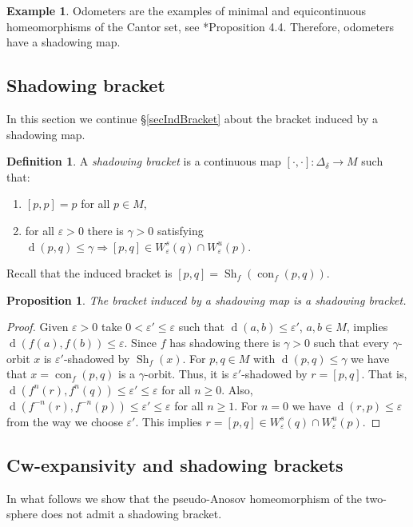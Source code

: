 \documentclass[12pt]{amsart}
\theoremstyle{plain}
\newtheorem{prop}[thm]{Proposition}
\theoremstyle{definition}
\newtheorem{ex}[thm]{Example}
\newtheorem{df}[thm]{Definition}
\theoremstyle{remark}
\DeclareMathOperator{\dist}{d}
\DeclareMathOperator{\con}{con}
\DeclareMathOperator{\shm}{Sh}
\renewcommand{\epsilon}{\varepsilon}
\begin{document}
\begin{ex}
	Odometers are the examples of minimal and equicontinuous homeomorphisms of the Cantor set, see \cite{Kurka}*{Proposition 4.4}.
	Therefore, odometers have a shadowing map.
\end{ex}

\subsection{Shadowing bracket}
\label{secShBra}
In this section we continue \S\ref{secIndBracket} about the bracket induced by a shadowing map.
\begin{df}
	A \textit{shadowing bracket} is a continuous map $[\cdot,\cdot]\colon \Delta_\delta\to M$
	such that:
	\begin{enumerate}
		\item $[p,p]=p$ for all $p\in M$,
		\item for all $\epsilon>0$ there is $\gamma>0$ satisfying
		$\dist(p,q)\leq\gamma \Rightarrow
		[p,q]\in W^s_\epsilon(q)\cap W^u_\epsilon(p).$
	\end{enumerate}
\end{df}
Recall that the induced bracket is
$[p,q]=\shm_f(\con_f(p,q)).$
\begin{prop}
	\label{propShmShb}
	The bracket induced by a shadowing map is a shadowing bracket.
\end{prop}

\begin{proof}
	Given $\epsilon>0$ take $0<\epsilon'\leq\epsilon$ such that
	$\dist(a,b)\leq\epsilon'$, $a,b\in M$, implies $\dist(f(a),f(b))\leq\epsilon$.
	Since $f$ has shadowing there is $\gamma>0$ such that every $\gamma$-orbit $x$ is $\epsilon'$-shadowed by $\shm_f(x)$.
	For $p,q\in M$ with $\dist(p,q)\leq\gamma$ we have that $x=\con_f(p,q)$ is a $\gamma$-orbit. Thus, it is $\epsilon'$-shadowed by $r=[p,q]$.
	That is, $\dist(f^n(r),f^n(q))\leq\epsilon'\leq\epsilon$ for all $n\geq 0$.
	Also, $\dist(f^{-n}(r),f^{-n}(p))\leq\epsilon'\leq\epsilon$ for all $n\geq 1$.
	For $n=0$ we have $\dist(r,p)\leq\epsilon$ from the way we choose $\epsilon'$.
	This implies
	$r=[p,q]\in W^s_\epsilon(q)\cap W^u_\epsilon(p)$.
\end{proof}

\subsection{Cw-expansivity and shadowing brackets} In what follows we show that the pseudo-Anosov homeomorphism of the two-sphere does not admit a shadowing bracket.
\end{document}
